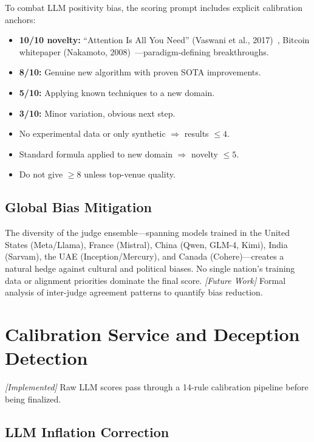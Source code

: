 \documentclass[11pt,a4paper]{article}
\theoremstyle{plain}
\theoremstyle{definition}
\theoremstyle{remark}
\begin{document}
To combat LLM positivity bias, the scoring prompt includes explicit calibration anchors:
\begin{itemize}
  \item \textbf{10/10 novelty:} ``Attention Is All You Need'' (Vaswani et al., 2017)~\cite{vaswani2017},
    Bitcoin whitepaper (Nakamoto, 2008)~\cite{nakamoto2008}---paradigm-defining breakthroughs.
  \item \textbf{8/10:} Genuine new algorithm with proven SOTA improvements.
  \item \textbf{5/10:} Applying known techniques to a new domain.
  \item \textbf{3/10:} Minor variation, obvious next step.
  \item No experimental data or only synthetic $\Rightarrow$ results $\leq 4$.
  \item Standard formula applied to new domain $\Rightarrow$ novelty $\leq 5$.
  \item Do not give $\geq 8$ unless top-venue quality.
\end{itemize}

\subsection{Global Bias Mitigation}

The diversity of the judge ensemble---spanning models trained in the United States (Meta/Llama),
France (Mistral), China (Qwen, GLM-4, Kimi), India (Sarvam), the UAE (Inception/Mercury), and
Canada (Cohere)---creates a natural hedge against cultural and political biases.  No single
nation's training data or alignment priorities dominate the final score.  \emph{[Future Work]}
Formal analysis of inter-judge agreement patterns to quantify bias reduction.

\section{Calibration Service and Deception Detection}
\label{sec:calibration}

\emph{[Implemented]} Raw LLM scores pass through a 14-rule calibration pipeline before being
finalized.

\subsection{LLM Inflation Correction}
\end{document}
